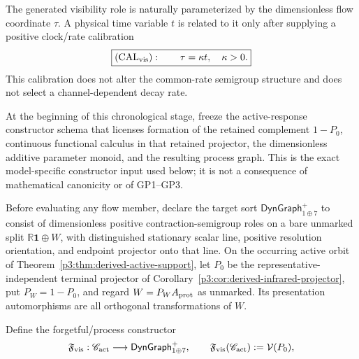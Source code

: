 \documentclass[12pt,a4paper]{article}
\begin{document}
\begin{definition}
\label{p3c:def:visibility-flow-calibration}
The generated visibility role is naturally parameterized by the dimensionless
flow coordinate \(\tau\).  A physical time variable \(t\) is related to it
only after supplying a positive clock/rate calibration
\[
 \boxed{(\mathrm{CAL}_{\rm vis}):\qquad \tau=\kappa t,\quad \kappa>0.}
\]
This calibration does not alter the common-rate semigroup structure and does
not select a channel-dependent decay rate.
\end{definition}

\begin{theorem}
\label{p3:thm:smooth-protected-resolution-semigroup}
At the beginning of this chronological stage, freeze the active-response
constructor schema that licenses formation of the retained complement
\(1-P_0\), continuous functional calculus in that retained projector, the
dimensionless additive parameter monoid, and the resulting process graph.
This is the exact model-specific constructor input used below; it is not a
consequence of mathematical canonicity or of GP1--GP3.

Before evaluating any flow member, declare the target sort
\(\mathsf{DynGraph}_{1\oplus7}^{+}\) to consist of dimensionless positive
contraction-semigroup roles on a bare unmarked split
\(\mathbb R\mathbf1\oplus W\), with distinguished stationary scalar line,
positive resolution orientation, and endpoint projector onto that line.  On
the occurring active orbit of Theorem~\ref{p3:thm:derived-active-support}, let
\(P_0\) be the representative-independent terminal projector of
Corollary~\ref{p3:cor:derived-infrared-projector}, put \(P_W=1-P_0\), and
regard \(W=P_WA_{\rm prot}\) as unmarked.  Its presentation automorphisms are
all orthogonal transformations of \(W\).

Define the forgetful/process constructor
\begin{equation}
\label{p3c:eq:visibility-derived-constructor}
 \mathfrak F_{\rm vis}:
 \mathscr C_{\rm act}\longrightarrow
 \mathsf{DynGraph}_{1\oplus7}^{+},
 \qquad
 \mathfrak F_{\rm vis}(\mathscr C_{\rm act})
 :=\mathcal V(P_0),
\end{equation}


\end{theorem}
\end{document}
